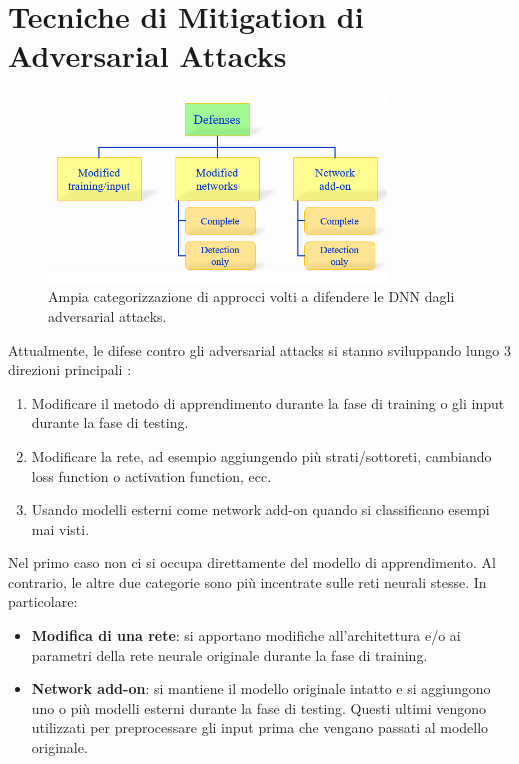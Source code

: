 \section{Tecniche di Mitigation di Adversarial Attacks}
\label{C3: Mitigation}
    \begin{figure}[!h]
        \centering
        \includegraphics[width=0.8\textwidth]{Images/Mitigation/Defenses.png}
        \caption{Ampia categorizzazione di approcci volti a difendere le DNN dagli adversarial attacks.}
        \label{Defenses}
    \end{figure}
    Attualmente, le difese contro gli adversarial attacks si stanno sviluppando lungo 3 direzioni principali %
    \cite{akhtar2018threat}:
        \begin{enumerate}
            \item Modificare il metodo di apprendimento durante la fase di training o gli input durante la fase di testing.
            \item Modificare la rete, ad esempio aggiungendo più strati/sottoreti, cambiando loss function o activation function, ecc.
            \item Usando modelli esterni come network add-on quando si classificano esempi mai visti.
        \end{enumerate}
    Nel primo caso non ci si occupa direttamente del modello di apprendimento. Al contrario, le altre due categorie sono più incentrate sulle reti neurali stesse. In particolare:
        \begin{itemize}
            \item \textbf{Modifica di una rete}: si apportano modifiche all'architettura e/o ai parametri della rete neurale originale durante la fase di training.
            \item \textbf{Network add-on}: si mantiene il modello originale intatto e si aggiungono uno o più modelli esterni durante la fase di testing. Questi ultimi vengono utilizzati per preprocessare gli input prima che vengano passati al modello originale.
        \end{itemize}
